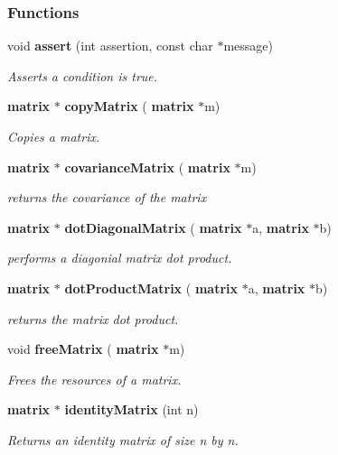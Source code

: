 \subsubsection*{Functions}
\begin{DoxyCompactItemize}
\item 
void \textbf{ assert} (int assertion, const char $\ast$message)
\begin{DoxyCompactList}\small\item\em Asserts a condition is true. \end{DoxyCompactList}\item 
\textbf{ matrix} $\ast$ \textbf{ copy\+Matrix} (\textbf{ matrix} $\ast$m)
\begin{DoxyCompactList}\small\item\em Copies a matrix. \end{DoxyCompactList}\item 
\textbf{ matrix} $\ast$ \textbf{ covariance\+Matrix} (\textbf{ matrix} $\ast$m)
\begin{DoxyCompactList}\small\item\em returns the covariance of the matrix \end{DoxyCompactList}\item 
\textbf{ matrix} $\ast$ \textbf{ dot\+Diagonal\+Matrix} (\textbf{ matrix} $\ast$a, \textbf{ matrix} $\ast$b)
\begin{DoxyCompactList}\small\item\em performs a diagonial matrix dot product. \end{DoxyCompactList}\item 
\textbf{ matrix} $\ast$ \textbf{ dot\+Product\+Matrix} (\textbf{ matrix} $\ast$a, \textbf{ matrix} $\ast$b)
\begin{DoxyCompactList}\small\item\em returns the matrix dot product. \end{DoxyCompactList}\item 
void \textbf{ free\+Matrix} (\textbf{ matrix} $\ast$m)
\begin{DoxyCompactList}\small\item\em Frees the resources of a matrix. \end{DoxyCompactList}\item 
\textbf{ matrix} $\ast$ \textbf{ identity\+Matrix} (int n)
\begin{DoxyCompactList}\small\item\em Returns an identity matrix of size n by n. \end{DoxyCompactList}\item 

\end{DoxyCompactItemize}
